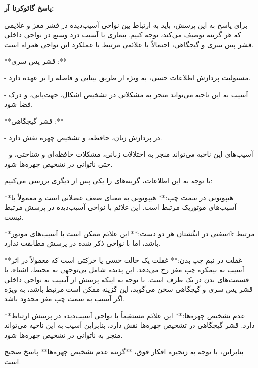 \textbf{
پاسخ گائوکرنا آر:
}

برای پاسخ به این پرسش، باید به ارتباط بین نواحی آسیب‌دیده در قشر مغز و علایمی که هر گزینه توصیف می‌کند، توجه کنیم. بیماری با آسیب درد وسیع در نواحی داخلی قشر پس سری و گیجگاهی، احتمالاً با علائمی مرتبط با عملکرد این نواحی همراه است.

**قشر پس سری 
:**

- مسئولیت پردازش اطلاعات حسی، به ویژه از طریق بینایی و فاصله را بر عهده دارد.

- آسیب به این ناحیه می‌تواند منجر به مشکلاتی در تشخیص اشکال، جهت‌یابی، و درک فضا شود.

**قشر گیجگاهی 
:**

- در پردازش زبان، حافظه، و تشخیص چهره نقش دارد.

- آسیب‌های این ناحیه می‌تواند منجر به اختلالات زبانی، مشکلات حافظه‌ای و شناختی، و حتی ناتوانی در تشخیص چهره‌ها شود.

با توجه به این اطلاعات، گزینه‌های را یکی پس از دیگری بررسی می‌کنیم:

\lr{[A]}
**هیپوتونی در سمت چپ:** هیپوتونی به معنای ضعف عضلانی است و معمولاً با آسیب‌های موتوریک مرتبط است. این علائم با نواحی آسیب‌دیده در پرسش مرتبط نیست.

\lr{[B]}
**سفتی در انگشتان هر دو دست:** این علائم ممکن است با آسیب‌های موتورik مرتبط باشد، اما با نواحی ذکر شده در پرسش مطابقت ندارد.

\lr{[C]}
**غفلت در نیم چپ بدن:** غفلت
یک حالت حسی یا حرکتی است که معمولاً در اثر آسیب به نیمکره چپ مغز رخ می‌دهد. این پدیده شامل بی‌توجهی به محیط، اشیاء، یا قسمت‌های بدن در یک طرف است. با توجه به اینکه پرسش از آسیب به نواحی داخلی قشر پس سری و گیجگاهی سخن می‌گوید، این گزینه ممکن است مرتبط باشد، به ویژه اگر آسیب به سمت چپ مغز محدود باشد.

\lr{[D]}
**عدم تشخیص چهره‌ها:** این علائم مستقیماً با نواحی آسیب‌دیده در پرسش ارتباط دارد. قشر گیجگاهی در تشخیص چهره‌ها نقش دارد، بنابراین آسیب به این ناحیه می‌تواند منجر به ناتوانی در تشخیص چهره‌ها شود.

بنابراین، با توجه به زنجیره افکار فوق، **گزینه
\lr{[D]}
عدم تشخیص چهره‌ها** پاسخ صحیح است.

